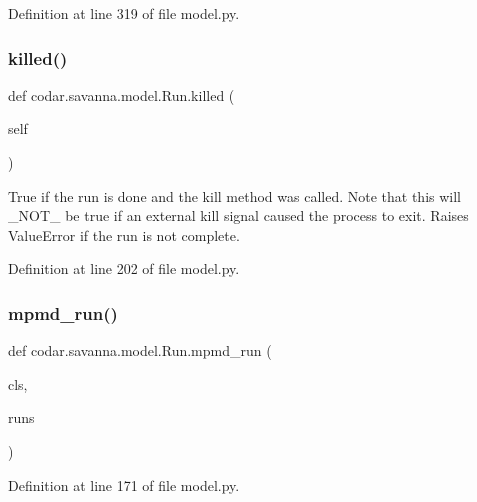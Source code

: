 Definition at line 319 of file model.\+py.

\mbox{\label{classcodar_1_1savanna_1_1model_1_1_run_abf7413759a4e4d456e978e5bade25e02}} 
\subsubsection{\texorpdfstring{killed()}{killed()}}
{\footnotesize\ttfamily def codar.\+savanna.\+model.\+Run.\+killed (\begin{DoxyParamCaption}\item[{}]{self }\end{DoxyParamCaption})}

\begin{DoxyVerb}True if the run is done and the kill method was called. Note that
this will _NOT_ be true if an external kill signal caused the process
to exit. Raises ValueError if the run is not complete.\end{DoxyVerb}
 

Definition at line 202 of file model.\+py.

\mbox{\label{classcodar_1_1savanna_1_1model_1_1_run_a1624f958c672fd64cbb2e4d124c69890}} 
\subsubsection{\texorpdfstring{mpmd\+\_\+run()}{mpmd\_run()}}
{\footnotesize\ttfamily def codar.\+savanna.\+model.\+Run.\+mpmd\+\_\+run (\begin{DoxyParamCaption}\item[{}]{cls,  }\item[{}]{runs }\end{DoxyParamCaption})}



Definition at line 171 of file model.\+py.

\mbox{\label{classcodar_1_1savanna_1_1model_1_1_run_a470a9f2082dcf6244fdf330dc8dc7990}} 
